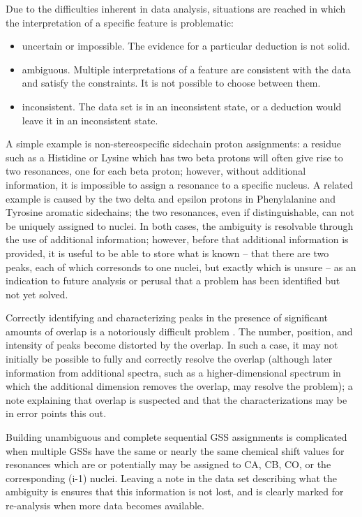Due to the difficulties inherent in data analysis, situations are reached
in which the interpretation of a specific feature is problematic:
\begin{itemize}
  \item uncertain or impossible.  The evidence for a particular deduction 
    is not solid.
  \item ambiguous.  Multiple interpretations of a feature are consistent
    with the data and satisfy the constraints.  It is not possible to choose
    between them.
  \item inconsistent.  The data set is in an inconsistent state, or a 
    deduction would leave it in an inconsistent state.
\end{itemize}
A simple example is non-stereospecific sidechain proton assignments: 
a residue such as a Histidine or Lysine which has two beta protons will 
often give rise to two resonances, one for each beta proton; however, 
without additional information, it is impossible to assign a resonance to
a specific nucleus.  A related example is caused by the two delta and epsilon
protons in Phenylalanine and Tyrosine aromatic sidechains; the two resonances,
even if distinguishable, can not be uniquely assigned to nuclei.  In both
cases, the ambiguity is resolvable through the use of additional information;
however, before that additional information is provided, it is useful to be
able to store what is known -- that there are two peaks, each of which 
corresonds to one nuclei, but exactly which is unsure -- as an indication to
future analysis or perusal that a problem has been identified but not yet
solved.

Correctly identifying and characterizing peaks in the presence of significant
amounts of overlap is a notoriously difficult problem \cite{guerry2011automated}.
The number, position, and intensity of peaks become distorted by the overlap.
In such a case, it may not initially be possible to fully and correctly
resolve the overlap (although later information from additional spectra, such
as a higher-dimensional spectrum in which the additional dimension removes
the overlap, may resolve the problem); a note explaining that overlap is
suspected and that the characterizations may be in error points this out.

Building unambiguous and complete sequential GSS assignments is complicated 
when multiple GSSs have the same or nearly the same chemical shift values
for resonances which are or potentially may be assigned to CA, CB, CO, or the
corresponding (i-1) nuclei.  Leaving a note in the data set describing what
the ambiguity is ensures that this information is not lost, and is clearly
marked for re-analysis when more data becomes available.


